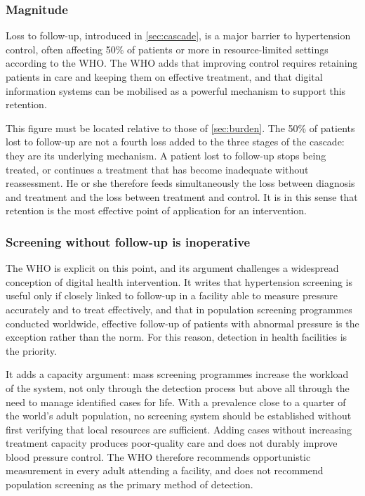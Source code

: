 \documentclass[12pt,a4paper,oneside]{report}
\begin{document}
\subsubsection{Magnitude}

Loss to follow-up, introduced in \cref{sec:cascade}, is a major barrier to hypertension control, often affecting 50\% of patients or more in resource-limited settings according to the WHO. The WHO adds that improving control requires retaining patients in care and keeping them on effective treatment, and that digital information systems can be mobilised as a powerful mechanism to support this retention.

This figure must be located relative to those of \cref{sec:burden}. The 50\% of patients lost to follow-up are not a fourth loss added to the three stages of the cascade: they are its underlying mechanism. A patient lost to follow-up stops being treated, or continues a treatment that has become inadequate without reassessment. He or she therefore feeds simultaneously the loss between diagnosis and treatment and the loss between treatment and control. It is in this sense that retention is the most effective point of application for an intervention.

\subsubsection{Screening without follow-up is inoperative}

The WHO is explicit on this point, and its argument challenges a widespread conception of digital health intervention. It writes that hypertension screening is useful only if closely linked to follow-up in a facility able to measure pressure accurately and to treat effectively, and that in population screening programmes conducted worldwide, effective follow-up of patients with abnormal pressure is the exception rather than the norm. For this reason, detection in health facilities is the priority.

It adds a capacity argument: mass screening programmes increase the workload of the system, not only through the detection process but above all through the need to manage identified cases for life. With a prevalence close to a quarter of the world's adult population, no screening system should be established without first verifying that local resources are sufficient. Adding cases without increasing treatment capacity produces poor-quality care and does not durably improve blood pressure control. The WHO therefore recommends opportunistic measurement in every adult attending a facility, and does not recommend population screening as the primary method of detection.
\end{document}
